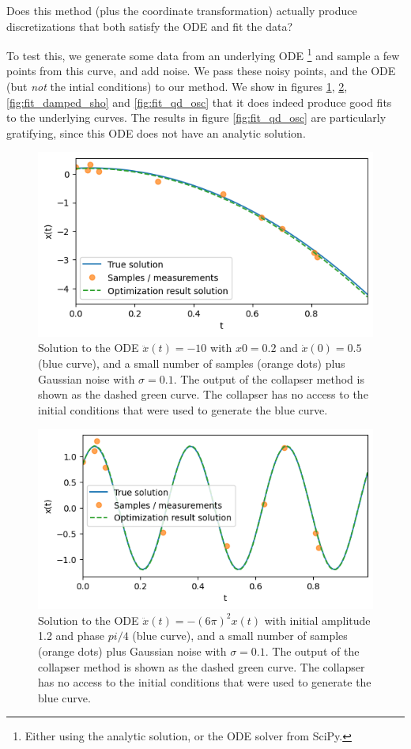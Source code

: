 \documentclass{article}
\begin{document}
Does this method (plus the coordinate transformation) actually produce discretizations that both satisfy the ODE and fit the data?

To test this, we generate some data from an underlying ODE%
\footnote{
Either using the analytic solution, or the ODE solver from SciPy.
}
and sample a few points from this curve, and add noise.
We pass these noisy points, and the ODE (but \emph{not} the intial conditions) to our method.
We show in figures \ref{fig:fit_const_acc}, \ref{fig:fit_sho}, \ref{fig:fit_damped_sho} and \ref{fig:fit_qd_osc} that it does indeed produce good fits to the underlying curves.
The results in figure \ref{fig:fit_qd_osc} are particularly gratifying, since this ODE does not have an analytic solution.

\begin{figure}
\includegraphics{images/results/fit_const_acc.png}
\centering
\caption{
Solution to the ODE $\ddot{x}(t) = -10$ with $x{0} = 0.2$ and $\dot{x}(0) = 0.5$ (blue curve), and a small number of samples (orange dots) plus Gaussian noise with $\sigma = 0.1$.
The output of the collapser method is shown as the dashed green curve.
The collapser has no access to the initial conditions that were used to generate the blue curve.
}
\label{fig:fit_const_acc}
\end{figure}

\begin{figure}
\includegraphics{images/results/fit_sho.png}
\centering
\caption{
Solution to the ODE $\ddot{x}(t) = - (6\pi)^2 x(t)$ with initial amplitude 1.2 and phase $pi/4$ (blue curve), and a small number of samples (orange dots) plus Gaussian noise with $\sigma = 0.1$.
The output of the collapser method is shown as the dashed green curve.
The collapser has no access to the initial conditions that were used to generate the blue curve.
}
\label{fig:fit_sho}
\end{figure}
\end{document}
